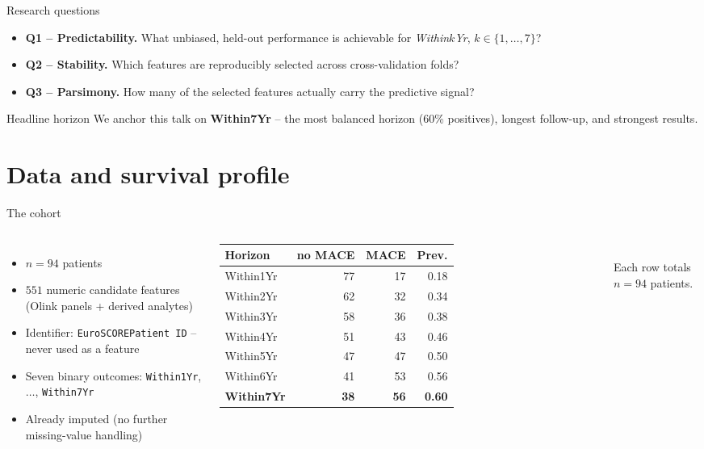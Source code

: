 \documentclass[10pt,aspectratio=169]{beamer}
\begin{document}
\begin{frame}{Research questions}
  \begin{itemize}
    \item \textbf{Q1 -- Predictability.} What unbiased, held-out
          performance is achievable for \emph{Within$k$Yr},
          $k\in\{1,\dots,7\}$?
    \item \textbf{Q2 -- Stability.} Which features are reproducibly
          selected across cross-validation folds?
    \item \textbf{Q3 -- Parsimony.} How many of the selected features
          actually carry the predictive signal?
  \end{itemize}
  \begin{block}{Headline horizon}
    We anchor this talk on \textbf{Within7Yr} -- the most balanced
    horizon (60\% positives), longest follow-up, and strongest results.
  \end{block}
\end{frame}

\section{Data and survival profile}

\begin{frame}{The cohort}
  \begin{columns}[T]
    \begin{itemize}
      \item $n=94$ patients
      \item $551$ numeric candidate features
            (Olink panels + derived analytes)
      \item Identifier: \texttt{EuroSCOREPatient ID} -- never used as a feature
      \item Seven binary outcomes:
            \texttt{Within1Yr}, $\dots$, \texttt{Within7Yr}
      \item Already imputed (no further missing-value handling)
    \end{itemize}
    \scriptsize
    \begin{tabular}{lrrr}
      \toprule
      Horizon & no MACE & MACE & Prev. \\
      \midrule
      Within1Yr & 77 & 17 & 0.18 \\
      Within2Yr & 62 & 32 & 0.34 \\
      Within3Yr & 58 & 36 & 0.38 \\
      Within4Yr & 51 & 43 & 0.46 \\
      Within5Yr & 47 & 47 & 0.50 \\
      Within6Yr & 41 & 53 & 0.56 \\
      \textbf{Within7Yr} & \textbf{38} & \textbf{56} & \textbf{0.60} \\
      \bottomrule
    \end{tabular}\\[2pt]
    \scriptsize Each row totals $n=94$ patients.
  \end{columns}
\end{frame}
\end{document}
